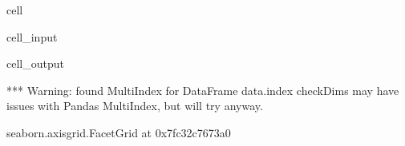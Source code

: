 \documentclass[letterpaper,table,10pt,english]{jupyterBook}
\begin{document}
\begin{sphinxuseclass}{cell}\begin{sphinxVerbatimInput}

\begin{sphinxuseclass}{cell_input}
\begin{sphinxVerbatim}[commandchars=\\\{\}]
  
     
                 
                     
\end{sphinxVerbatim}

\end{sphinxuseclass}\end{sphinxVerbatimInput}
\begin{sphinxVerbatimOutput}

\begin{sphinxuseclass}{cell_output}
\begin{sphinxVerbatim}[commandchars=\\\{\}]
*** Warning: found MultiIndex for DataFrame data.index \PYGZhy{} checkDims may have issues with Pandas MultiIndex, but will try anyway.
\end{sphinxVerbatim}

\begin{sphinxVerbatim}[commandchars=\\\{\}]
\PYGZlt{}seaborn.axisgrid.FacetGrid at 0x7fc32c7673a0\PYGZgt{}
\end{sphinxVerbatim}

\noindent{}

\end{sphinxuseclass}\end{sphinxVerbatimOutput}

\end{sphinxuseclass}
\end{document}
